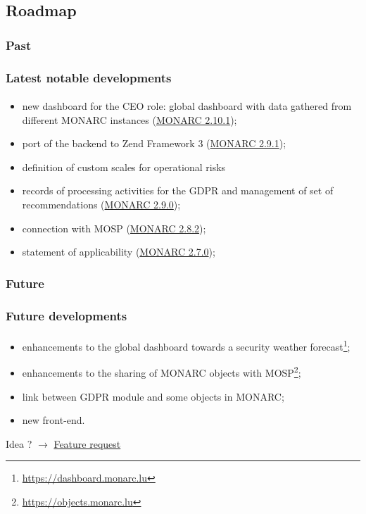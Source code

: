 \subsection{Roadmap}
\subsubsection{Past}
\begin{frame}
  \frametitle{Latest notable developments}
  \framesubtitle{}
  \begin{itemize}
    (\href{https://www.monarc.lu/news/2021/09/02/monarc-2110-released/}{MONARC 2.11.0});
    \item new dashboard for the CEO role: global dashboard with data gathered
    from different MONARC instances
    (\href{https://www.monarc.lu/news/2020/12/18/monarc-2101-released/}{MONARC 2.10.1});
    \item port of the backend to Zend Framework 3
    (\href{https://www.monarc.lu/news/2019/11/25/monarc-291-released/}{MONARC 2.9.1});
    \item definition of custom scales for operational risks
    \item records of processing activities for the GDPR
    and management of set of recommendations
    (\href{https://www.monarc.lu/news/2019/08/23/monarc-290-released/}{MONARC 2.9.0});
    \item connection with MOSP
    (\href{https://www.monarc.lu/news/2019/05/28/monarc-282-released/}{MONARC 2.8.2});
    \item statement of applicability
    (\href{https://www.monarc.lu/news/2018/08/22/monarc-270-released/}{MONARC 2.7.0});

  \end{itemize}
\end{frame}

\subsubsection{Future}
\begin{frame}
  \frametitle{Future developments}
  \framesubtitle{}
  \begin{itemize}
    \item enhancements to the global dashboard towards a
    security weather forecast\footnote{\url{https://dashboard.monarc.lu}};
    \item enhancements to the sharing of MONARC objects with
    MOSP\footnote{\url{https://objects.monarc.lu}};
    \item link between GDPR module and some objects in MONARC;
    \item new front-end.
  \end{itemize}
  \bigskip
  Idea ?
  $\rightarrow$
  \href{https://github.com/monarc-project/MonarcAppFO/issues/new?labels=feature+request}{Feature request}
\end{frame}
